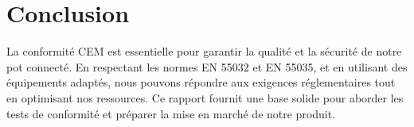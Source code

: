 \documentclass[a4paper,12pt]{article}
\begin{document}
\section*{Conclusion}
La conformité CEM est essentielle pour garantir la qualité et la sécurité de notre pot connecté. En respectant les normes EN 55032 et EN 55035, et en utilisant des équipements adaptés, nous pouvons répondre aux exigences réglementaires tout en optimisant nos ressources. Ce rapport fournit une base solide pour aborder les tests de conformité et préparer la mise en marché de notre produit.
\end{document}

